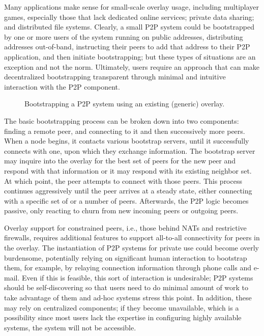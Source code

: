 \documentclass[conference]{IEEEtran}
\begin{document}
Many applications make sense for small-scale overlay usage, including
multiplayer games, especially those that lack dedicated online services;
private data sharing; and distributed file systems.  Clearly, a small P2P
system could be bootstrapped by one or more users of the system running on
public addresses, distributing addresses out-of-band, instructing their peers
to add that address to their P2P application, and then initiate bootstrapping;
but these types of situations are an exception and not the norm.  Ultimately,
users require an approach that can make decentralized bootstrapping transparent
through minimal and intuitive interaction with the P2P component.

\begin{figure*}[h!t!]
\centering
{}
\caption{Bootstrapping a P2P system using an existing (generic) overlay.}
\label{fig:bootstrap}
\end{figure*}

The basic bootstrapping process can be broken down into two components: finding
a remote peer, and connecting to it and then successively more peers.  When a
node begins, it contacts various bootstrap servers, until it successfully
connects with one, upon which they exchange information.  The bootstrap server
may inquire into the overlay for the best set of peers for the new peer and
respond with that information or it may respond with its existing neighbor set.
At which point, the peer attempts to connect with those peers.  This process
continues aggressively until the peer arrives at a steady state, either
connecting with a specific set of or a number of peers.  Afterwards, the P2P
logic becomes passive, only reacting to churn from new incoming peers or
outgoing peers.

Overlay support for constrained peers, i.e., those behind NATs and restrictive
firewalls, requires additional features to support all-to-all connectivity for
peers in the overlay.  The instantiation of P2P systems for private use could
become overly burdensome, potentially relying on significant human interaction
to bootstrap them, for example, by relaying connection information through
phone calls and e-mail.  Even if this is feasible, this sort of interaction is
undesirable; P2P systems should be self-discovering so that users need to do
minimal amount of work to take advantage of them and ad-hoc systems stress this
point.  In addition, these may rely on centralized components; if they become
unavailable, which is a possibility since most users lack the expertise in
configuring highly available systems, the system will not be accessible.
\end{document}
